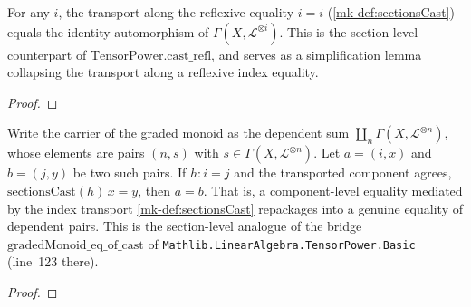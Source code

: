 \begin{lemma}\label{mk-lem:sectionsCast_refl}
  \leanok

  For any \(i\), the transport along the reflexive equality \(i = i\)
  (\ref{mk-def:sectionsCast}) equals the identity automorphism of
  \(\Gamma(X, \mathcal{L}^{\otimes i})\). This is the section-level counterpart of
  \(\mathrm{TensorPower.cast\_refl}\), and serves as a simplification lemma
  collapsing the transport along a reflexive index equality.
\end{lemma}

\begin{proof}
  \leanok\end{proof}

\begin{lemma}\label{mk-lem:gradedMonoid_eq_of_cast}
  \leanok

  Write the carrier of the graded monoid as the dependent sum
  \(\coprod_{n} \Gamma(X, \mathcal{L}^{\otimes n})\), whose elements are pairs
  \((n, s)\) with \(s \in \Gamma(X, \mathcal{L}^{\otimes n})\). Let
  \(a = (i, x)\) and \(b = (j, y)\) be two such pairs. If \(h : i = j\) and the
  transported component agrees, \(\mathrm{sectionsCast}(h)\,x = y\), then
  \(a = b\). That is, a component-level equality mediated by the index transport
  \ref{mk-def:sectionsCast} repackages into a genuine equality of dependent pairs.
  This is the section-level analogue of the bridge
  \(\mathrm{gradedMonoid\_eq\_of\_cast}\) of
  \texttt{Mathlib.LinearAlgebra.TensorPower.Basic} (line~123 there).
\end{lemma}

\begin{proof}
  \leanok
  \end{proof}

